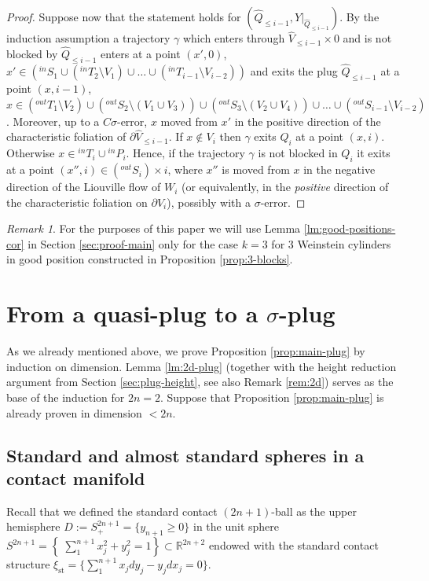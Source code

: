 \documentclass[12pt]{amsart}
\theoremstyle{plain}
\theoremstyle{definition}
\theoremstyle{remark}
\newtheorem{remark}[theorem]{Remark}
\newcommand{\R}{\mathbb{R}}
\newcommand{\p}{\partial}
\newcommand{\wh}{\widehat}
\newcommand{\st}{\mathrm{st}}
\begin{document}
\begin{proof}
      
    Suppose now that the statement holds for  $(\wh Q_{\leq i-1}, Y|_{\wh Q_{\leq i-1}})$.   By the induction assumption  a   trajectory $\gamma$ which  enters through $\wh V_{\leq i-1}\times 0 $ and is not blocked by $\wh Q_{\leq i-1}$  enters at a point $(x',0)$, $x'\in\left({}^{in}S_1\cup( { }^{in}T_2\setminus V_1)\cup\dots\cup(
   {}^{in}T_{i-1}\setminus V_{i-2})\right)$  and exits the plug $\wh Q_{\leq i-1}$  at a point
   $(x, i-1)$, $x\in  ({}^{out}T_1\setminus V_2)\cup( { }^{out}S_2\setminus (V_1\cup V_3))\cup( { }^{out}S_3\setminus (V_2\cup V_4))\cup\dots\cup({}^{out}S_{i-1}\setminus V_{i-2})$. Moreover, up to a $C\sigma$-error, $x$ moved from $x'$ in the positive direction of the characteristic foliation of $\p\wh V_{\leq i-1}$.  If $x\notin  V_i$ then $\gamma$ exits $Q_i$ at a point $(x,i)$. Otherwise $x\in {}^{in}T_i\cup{}^{in}P_i$. Hence, if the trajectory $\gamma$ is not blocked in $Q_i$ it exits at a point $(x'',i)\in \left({}^{out}S_i\right)\times i$, where $x''$ is moved from $x$ in the negative direction of the Liouville flow of $W_i$ (or equivalently, in the {\em positive} direction of the characteristic foliation on $\p V_i$),   possibly with a $\sigma$-error. 
     \end{proof}
     \begin{remark} For the purposes of this paper we will use Lemma \ref{lm:good-positions-cor}  in Section \ref{sec:proof-main} only for the case $k=3$ for  3 Weinstein cylinders in good position constructed in Proposition \ref{prop:3-blocks}.
     \end{remark}







     
 \section{From a quasi-plug to  a $\sigma$-plug}\label{sec:main_plug}
 As we already mentioned above, we prove Proposition \ref{prop:main-plug} by induction on dimension.
 Lemma \ref{lm:2d-plug} (together with  the height  reduction argument from Section \ref{sec:plug-height}, see also Remark \ref{rem:2d})  serves as  the base of the induction for  $2n=2$.
 Suppose that Proposition \ref{prop:main-plug} is already proven in dimension $<2n$.
 
 
\subsection{Standard and almost standard spheres in a contact manifold}
 Recall that we defined the standard contact $(2n+1)$-ball as  the upper hemisphere $D:=S^{2n+1}_+=\{y_{n+1}\geq 0\}$ in the unit  sphere  $ S^{2n+1}=\left\{\;\sum\limits_1^{n+1}x_j^2+y_j^2=1\right\}\subset \R^{2n+2}$ endowed with the standard contact structure $\xi_\st=\{ \sum\limits_1^{n+1} x_jdy_j-y_jdx_j =0\}.$
\end{document}
